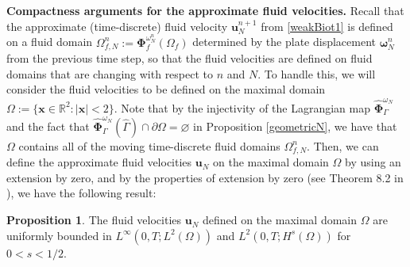 \documentclass[11pt]{article}
\newcommand{\bd}{\boldsymbol}
\def\R{{\mathbb R}}
\theoremstyle{definition}
\newtheorem{proposition}{Proposition}[section]
\begin{document}
\noindent \textbf{Compactness arguments for the approximate fluid velocities.} Recall that the approximate (time-discrete) fluid velocity $\bd{u}^{n + 1}_{N}$ from \eqref{weakBiot1} is defined on a fluid domain $\Omega^{n}_{f, N} := \bd{\Phi}^{\omega^{n}_{N}}_{f}(\Omega_{f})$ determined by the plate displacement $\bd{\omega}^{n}_{N}$ from the previous time step, so that the fluid velocities are defined on fluid domains that are changing with respect to $n$ and $N$. To handle this, we will consider the fluid velocities to be defined on the maximal domain $\Omega := \{\bd{x} \in \R^{2} : |\bd{x}| < 2\}$. Note that by the injectivity of the Lagrangian map $\hat{\bd{\Phi}}^{\omega_{N}}_{\Gamma}$ and the fact that $\hat{\bd{\Phi}}^{\omega_{N}}_{\Gamma}(\hat{\Gamma}) \cap \partial \Omega = \varnothing$ in Proposition \ref{geometricN}, we have that $\Omega$ contains all of the moving time-discrete fluid domains $\Omega^{n}_{f, N}$. Then, we can define the approximate fluid velocities $\bd{u}_{N}$ on the maximal domain $\Omega$ by using an extension by zero, and by the properties of extension by zero (see Theorem 8.2 in \cite{KuanTawri}), we have the following result:

\begin{proposition}\label{fluidcompact}
The fluid velocities $\bd{u}_{N}$ defined on the maximal domain $\Omega$ are uniformly bounded in $L^{\infty}(0, T; L^{2}(\Omega))$ and $L^{2}(0, T; H^{s}(\Omega))$ for $0 < s < 1/2$. 
\end{proposition}
\end{document}
